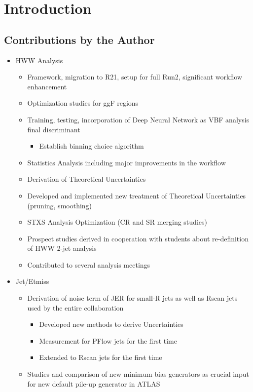 \chapter{Introduction}
\label{sec:intro}


\section{Contributions by the Author}
\label{sec:contributions}

\begin{itemize}
    \item HWW Analysis
          \begin{itemize}
              \item Framework, migration to R21, setup for full Run2, significant workflow enhancement
              \item Optimization studies for ggF regions
              \item Training, testing, incorporation of Deep Neural Network as VBF analysis final discriminant
              \begin{itemize}
                  \item Establish binning choice algorithm
              \end{itemize}
              \item Statistics Analysis including major improvements in the workflow
              \item Derivation of Theoretical Uncertainties
              \item Developed and implemented new treatment of Theoretical Uncertainties (pruning, smoothing)
              \item STXS Analysis Optimization (CR and SR merging studies)
              \item Prospect studies derived in cooperation with students about re-definition of HWW 2-jet analysis
              \item Contributed to several analysis meetings
          \end{itemize}
    \item Jet/Etmiss
          \begin{itemize}
              \item Derivation of noise term of JER for small-R jets as well as Rscan jets used by the entire collaboration
              \begin{itemize}
                  \item Developed new methods to derive Uncertainties
                  \item Measurement for PFlow jets for the first time
                  \item Extended to Rscan jets for the first time
              \end{itemize}
              \item Studies and comparison of new minimum bias generators as crucial input for new default pile-up generator in ATLAS
          \end{itemize}
\end{itemize}

